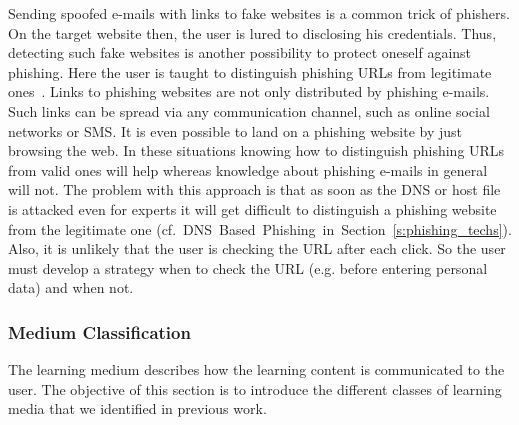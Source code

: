 \begin{description}[leftmargin=0cm]
	\item[URL Based Knowledge] Sending spoofed e-mails with links to fake websites is a common trick of phishers.
 On the target website then, the user is lured to disclosing his credentials.
 Thus, detecting such fake websites is another possibility to protect oneself against phishing.
 Here the user is taught to distinguish phishing URLs from legitimate ones~\cite{sheng2007antiphishingphil, arachchilage2012designing}. 
Links to phishing websites are not only distributed by phishing e-mails.
 Such links can be spread via any communication channel, such as online social networks or SMS.
 It is even possible to land on a phishing website by just browsing the web.
 In these situations knowing how to distinguish phishing URLs from valid ones will help whereas knowledge about phishing e-mails in general will not.
 The problem with this approach is that as soon as the DNS or host file is attacked even for experts it will get difficult to distinguish a phishing website from the legitimate one (cf.~DNS~Based~Phishing~in~Section~\ref{s:phishing_techs}).
 Also, it is unlikely that the user is checking the URL after each click. So the user must develop a strategy when to check the URL (e.g. before entering personal data) and when not.

\end{description}


\subsubsection{Medium Classification}
The learning medium describes how the learning content is communicated to the user. 
The objective of this section is to introduce the different classes of learning media that we identified in previous work.

